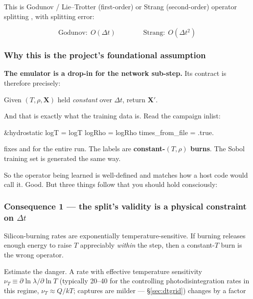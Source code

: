 This is Godunov / Lie--Trotter (first-order) or Strang (second-order) operator
splitting \citep{strang1968,blanes2008}, with splitting error:

\begin{equation*}
\text{Godunov:}\ \ O(\Delta t) \qquad\qquad \text{Strang:}\ \ O(\Delta t^2)
\end{equation*}

\subsubsection{Why this is the project's foundational assumption}
\label{sec:whyfoundational}

\textbf{The emulator is a drop-in for the network sub-step.} Its contract is
therefore precisely:

\begin{invariant}
Given $(T, \rho, \mathbf{X})$ held \emph{constant} over $\Delta t$, return
$\mathbf{X}'$.
\end{invariant}

And that is exactly what the training data is. Read the campaign inlist:

\begin{srclisting}
&hydrostatic
   logT = {logT}
   logRho = {logRho}
   times_from_file = .true.
\end{srclisting}

 fixes  and
 for the entire run. The labels are
\textbf{constant-$(T,\rho)$ burns}. The Sobol training set is generated the same
way.

So the operator being learned is well-defined and matches how a host code would
call it. Good. But three things follow that you should hold consciously:

\subsubsection{Consequence 1 --- the split's validity is a physical constraint on
  \texorpdfstring{$\Delta t$}{dt}}
\label{sec:splitconsequence1}

Silicon-burning rates are exponentially temperature-sensitive. If burning
releases enough energy to raise $T$ appreciably \emph{within} the step, then a
constant-$T$ burn is the wrong operator.

Estimate the danger. A rate with effective temperature sensitivity
$\nu_T \equiv \partial\ln\lambda/\partial\ln T$ (typically 20--40 for the
controlling photodisintegration rates in this regime, $\nu_T \approx Q/kT$;
captures are milder --- \S\ref{sec:dtgrid}) changes by a factor

